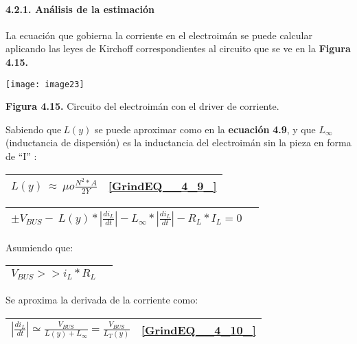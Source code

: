\documentclass{article} %
\begin{document}
\noindent 
\paragraph{4.2.1. An\'{a}lisis de la estimaci\'{o}n}

\noindent La ecuaci\'{o}n que gobierna la corriente en el electroim\'{a}n se puede calcular aplicando las leyes de Kirchoff correspondientes al circuito que se ve en la \textbf{Figura 4.15.}

\noindent \texttt{[image: image23]}

\noindent \textbf{Figura 4.15.} Circuito del electroim\'{a}n con el driver de corriente.

\noindent 

\noindent Sabiendo que$\ L(y)$ se puede aproximar como en la \textbf{ecuaci\'{o}n} \textbf{4.9}, y que $L_{\infty }$(inductancia de dispersi\'{o}n) es la inductancia del electroim\'{a}n sin la pieza en forma de ``I'' :

\noindent 

\begin{tabular}{|p{3.9in}|p{0.4in}|} \hline 
$L(y)\ \approx \ \mu o\frac{N^2*A}{2Y}$ & \eqref{GrindEQ__4_9_}  \\ \hline 
\end{tabular}



\begin{tabular}{|p{3.9in}|p{0.4in}|} \hline 
$\pm V_{BUS}-\ L(y)*\left|\frac{{di}_L}{dt}\right|-L_{\infty }*\left|\frac{{di}_L}{dt}\right|-R_L*I_L=0$ &  \\ \hline 
\end{tabular}



\noindent Asumiendo que:

 

\begin{tabular}{|p{3.9in}|p{0.4in}|} \hline 
$V_{BUS}>>i_L*R_L$ &  \\ \hline 
\end{tabular}



\noindent Se aproxima la derivada de la corriente como:

\noindent 

\begin{tabular}{|p{3.9in}|p{0.4in}|} \hline 
$\left|\frac{{di}_L}{dt}\right|\simeq \frac{V_{BUS}}{L(y)+L_{\infty }}=\frac{V_{BUS}}{L_T(y)}$ & \eqref{GrindEQ__4_10_}  \\ \hline 
\end{tabular}
\end{document}
